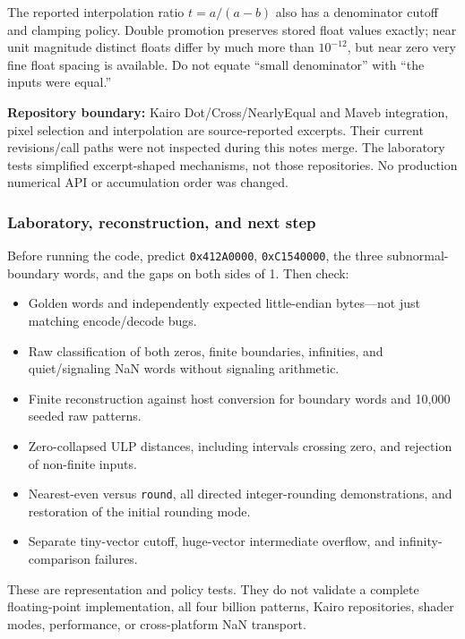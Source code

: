 The reported interpolation ratio \(t=a/(a-b)\) also has a denominator cutoff and clamping policy. Double promotion preserves stored float values exactly; near unit magnitude distinct floats differ by much more than \(10^{-12}\), but near zero very fine float spacing is available. Do not equate ``small denominator'' with ``the inputs were equal.''

\textbf{Repository boundary:} Kairo Dot/Cross/NearlyEqual and Maveb integration, pixel selection and interpolation are source-reported excerpts. Their current revisions/call paths were not inspected during this notes merge. The laboratory tests simplified excerpt-shaped mechanisms, not those repositories. No production numerical API or accumulation order was changed.

\subsubsection{Laboratory, reconstruction, and next step}\label{01-foundations-i-ch001-laboratory-reconstruction-and-next-step}

\hypertarget{01-foundations-i-ch001-laboratory-reconstruction-and-next-step}{}

Before running the code, predict \texttt{0x412A0000}, \texttt{0xC1540000}, the three subnormal-boundary words, and the gaps on both sides of 1. Then check:

\begin{itemize}
\tightlist
\item
  Golden words and independently expected little-endian bytes---not just matching encode/decode bugs.
\item
  Raw classification of both zeros, finite boundaries, infinities, and quiet/signaling NaN words without signaling arithmetic.
\item
  Finite reconstruction against host conversion for boundary words and 10,000 seeded raw patterns.
\item
  Zero-collapsed ULP distances, including intervals crossing zero, and rejection of non-finite inputs.
\item
  Nearest-even versus \texttt{round}, all directed integer-rounding demonstrations, and restoration of the initial rounding mode.
\item
  Separate tiny-vector cutoff, huge-vector intermediate overflow, and infinity-comparison failures.
\end{itemize}

These are representation and policy tests. They do not validate a complete floating-point implementation, all four billion patterns, Kairo repositories, shader modes, performance, or cross-platform NaN transport.

